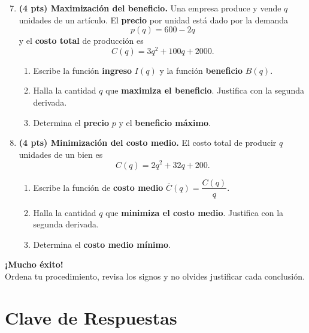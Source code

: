 \documentclass[12pt, letterpaper]{article}
\begin{document}
\begin{enumerate}[leftmargin=*]
  \setcounter{enumi}{6}
  \item \textbf{(4 pts) Maximización del beneficio.}
        Una empresa produce y vende $q$ unidades de un artículo. El \textbf{precio} por unidad está dado por la demanda
        \[
          p(q) = 600 - 2q
        \]
        y el \textbf{costo total} de producción es
        \[
          C(q) = 3q^{2} + 100q + 2000.
        \]
        \begin{enumerate}[label=\alph*)]
          \item Escribe la función \textbf{ingreso} $I(q)$ y la función \textbf{beneficio} $B(q)$.
          \item Halla la cantidad $q$ que \textbf{maximiza el beneficio}. Justifica con la segunda derivada.
          \item Determina el \textbf{precio} $p$ y el \textbf{beneficio máximo}.
        \end{enumerate}

  \item \textbf{(4 pts) Minimización del costo medio.}
        El costo total de producir $q$ unidades de un bien es
        \[
          C(q) = 2q^{2} + 32q + 200.
        \]
        \begin{enumerate}[label=\alph*)]
          \item Escribe la función de \textbf{costo medio} $\overline{C}(q) = \dfrac{C(q)}{q}$.
          \item Halla la cantidad $q$ que \textbf{minimiza el costo medio}. Justifica con la segunda derivada.
          \item Determina el \textbf{costo medio mínimo}.
        \end{enumerate}
\end{enumerate}

\vspace{12pt}
\begin{center}
  {\Large\bfseries\color{mwprimario} ¡Mucho éxito!}\\[4pt]
  {\large\color{gray} Ordena tu procedimiento, revisa los signos y no olvides justificar cada conclusión.}
\end{center}

\ifmwclaves
  \section{Clave de Respuestas}
\end{document}
